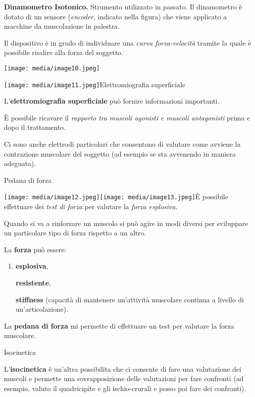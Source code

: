 \documentclass[]{article}
\begin{document}
\textbf{Dinamometro Isotonico.} Strumento utilizzato in passato. Il
dinamometro è dotato di un sensore (\emph{encoder}, indicato nella
figura) che viene applicato a macchine da muscolazione in palestra.

Il dispositivo è in grado di individuare una \emph{curva forza-velocità}
tramite la quale è possibile risalire alla forza del soggetto.

\texttt{[image: media/image10.jpeg]}

\texttt{[image: media/image11.jpeg]}Elettromiografia
superficiale

L'\textbf{elettromiografia superficiale} può fornire informazioni
importanti.

È possibile ricavare il \emph{rapporto tra muscoli agonisti e muscoli
antagonisti} prima e dopo il trattamento.

Ci sono anche elettrodi particolari che consentono di valutare come
avviene la contrazione muscolare del soggetto (ad esempio se sta
avvenendo in maniera adeguata).

Pedana di forza

\texttt{[image: media/image12.jpeg]}\texttt{[image: media/image13.jpeg]}È
possibile effettuare dei \emph{test di forza} per valutare la
\emph{forza esplosiva. }

Quando si va a rinforzare un muscolo si può agire in modi diversi per
sviluppare un particolare tipo di forza rispetto a un altro.

La \textbf{forza} può essere:

\begin{enumerate}
\def\labelenumi{\arabic{enumi}.}
\item
  \textbf{esplosiva},

  \textbf{resistente},

  \textbf{stiffness} (capacità di mantenere un'attività muscolare
  continua a livello di un'articolazione).
\end{enumerate}

La \textbf{pedana di forza} mi permette di effettuare un test per
valutare la forza muscolare.

Isocinetica

L'\textbf{isocinetica} è un'altra possibilita che ci consente di fare
una valutazione dei muscoli e permette una sovrapposizione delle
valutazioni per fare confronti (ad esempio, valuto il quadricipite e gli
ischio-crurali e posso poi fare dei confronti).
\end{document}
